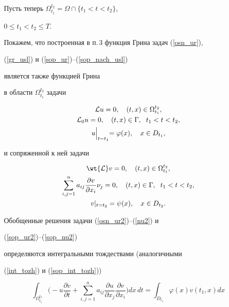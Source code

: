 Пусть теперь $\Omega_{t_1}^{t_2}=\Omega\cap\{ t_1<t<t_2\}$,


$0\leq t_1 < t_2 \leq T$.


Покажем, что построенная в п.\,3 функция Грина задач (\ref{osn_ur}),


(\ref{gr_usl}) и (\ref{sop_ur})--(\ref{sop_nach_usl})


является также функцией Грина


в области $\Omega_{t_1}^{t_2}$ задачи


\begin{gather}


{\cal L}u=0, \quad (t,x)\in \Omega_{t_1}^{t_2} , \label{osn_ur2} \\


%


{\cal L}_0 u=0, \quad (t,x)\in \Gamma, \ \; t_1<t<t_2, \label{gr_usl2} \\


%


u\Bigl|_{t=t_1}=\varphi(x), \quad x\in D_{t_1}, \label{nu2}


\end{gather}


и сопряженной к ней задачи


\begin{gather}


\wt{\cal L}v=0, \quad (t,x)\in \Omega_{t_1}^{t_2} ,\label{sop_ur2} \\


%


\sum_{i,j=1}^n a_{ij} \frac{\partial v}{\partial x_i} \nu_j=0,


\quad (t,x)\in \Gamma, \ \; t_1<t<t_2, \label{sop_gr_usl2} \\


%


v|_{t=t_2}=\psi(x),\quad x\in D_{t_2}. \label{sop_nu2}


\end{gather}


Обобщенные решения задачи (\ref{osn_ur2})--(\ref{nu2}) и 


(\ref{sop_ur2})--(\ref{sop_nu2})


определяются интегральными тождествами (аналогичными


(\ref{int_tozh}) и (\ref{sop_int_tozh}))


\begin{equation}


\int_{\Omega_{t_1}^{t_2} }


\bigg(-u \frac{\partial v}{\partial t}+


\sum_{i,j=1}^n a_{ij}\frac{\partial u}{\partial x_j}


\frac{\partial v}{\partial x_i}\bigg) dx\,dt=


\int_{D_{t_1}} \varphi(x)v(t_1,x) dx


\label{4.7}


\end{equation} 


